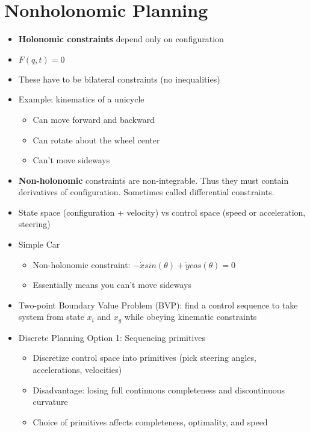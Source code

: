 \documentclass[../main.tex]{subfiles}
\begin{document}
    \section{Nonholonomic Planning}
    \begin{itemize}
        \item \textbf{Holonomic constraints} depend only on configuration
        \item $F(q,t) = 0$
        \item These have to be bilateral constraints (no inequalities)
        \item Example: kinematics of a unicycle
        \begin{itemize}
            \item Can move forward and backward
            \item Can rotate about the wheel center
            \item Can't move sideways
        \end{itemize}
        \item \textbf{Non-holonomic} constraints are non-integrable. Thus they must contain derivatives of configuration. Sometimes called differential constraints.
        \item State space (configuration + velocity) vs control space (speed or acceleration, steering)
        \item Simple Car
        \begin{itemize}
            \item Non-holonomic constraint: $-\dot{x}sin(\theta) + \dot{y}cos(\theta) = 0$
            \item Essentially means you can't move sideways
        \end{itemize}
        \item Two-point Boundary Value Problem (BVP): find a control sequence to take system from state $x_{i}$ and $x_{g}$ while obeying kinematic constraints
        \item Discrete Planning Option 1: Sequencing primitives
        \begin{itemize}
            \item Discretize control space into primitives (pick steering angles, accelerations, velocities)
            \item Disadvantage: losing full continuous completeness and discontinuous curvature
            \item Choice of primitives affects completeness, optimality, and speed
        \end{itemize}

\end{itemize}
\end{document}
